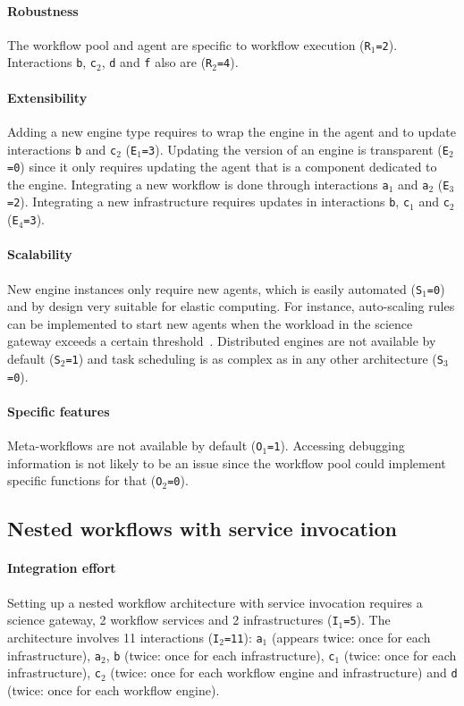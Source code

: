 \documentclass[preprint,3p,twocolumn]{elsarticle}
\begin{document}
\paragraph{Robustness} The workflow pool and agent are specific to
workflow execution (\texttt{R$_1$=2}). Interactions \texttt{b},
\texttt{c$_2$}, \texttt{d} and \texttt{f} also are (\texttt{R$_2$=4}).

\paragraph{Extensibility} Adding a new engine type requires to wrap
the engine in the agent and to update interactions \texttt{b} and
\texttt{c$_2$} (\texttt{E$_1$=3}). Updating the version of an engine
is transparent (\texttt{E$_2$=0}) since it only requires updating the
agent that is a component dedicated to the engine. Integrating a new workflow is
done through interactions \texttt{a$_1$} and \texttt{a$_2$}
(\texttt{E$_3$=2}). Integrating a new infrastructure requires updates
in interactions \texttt{b}, \texttt{c$_1$} and \texttt{c$_2$}
(\texttt{E$_4$=3}).

\paragraph{Scalability} New engine instances only require new agents,
which is easily automated (\texttt{S$_1$=0}) and by design very
suitable for elastic computing. For instance, auto-scaling rules can
be implemented to start new agents when the workload in the science
gateway exceeds a certain threshold~\cite{lorido2012auto}. Distributed
engines are not available by default (\texttt{S$_2$=1}) and task
scheduling is as complex as in any other architecture
(\texttt{S$_3$=0}).

\paragraph{Specific features} Meta-workflows are not available by default
(\texttt{O$_1$=1}).  Accessing debugging information is not likely to
be an issue since the workflow pool could implement specific functions
for that (\texttt{O$_2$=0}).

\subsection{Nested workflows with service invocation}

\paragraph{Integration effort} Setting up a nested workflow architecture with
service invocation requires a science gateway, 2 workflow services and
2 infrastructures (\texttt{I$_1$=5}). The architecture involves 11
interactions (\texttt{I$_2$=11}): \texttt{a$_1$} (appears twice: once for each
infrastructure), \texttt{a$_2$}, \texttt{b} (twice: once for each
infrastructure), \texttt{c$_1$} (twice: once for each infrastructure),
\texttt{c$_2$} (twice: once for each workflow engine and
infrastructure) and \texttt{d} (twice: once for each workflow engine).
\end{document}
